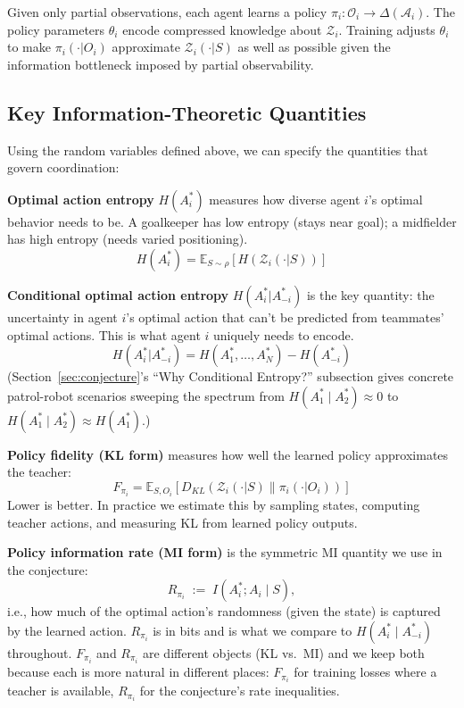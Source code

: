 \documentclass[10pt, letterpaper]{article}
\begin{document}
Given only partial observations, each agent learns a policy $\pi_i: \mathcal{O}_i \to \Delta(\mathcal{A}_i)$. The policy parameters $\theta_i$ encode compressed knowledge about $\mathcal{Z}_i$. Training adjusts $\theta_i$ to make $\pi_i(\cdot|O_i)$ approximate $\mathcal{Z}_i(\cdot|S)$ as well as possible given the information bottleneck imposed by partial observability.

\subsection{Key Information-Theoretic Quantities}

Using the random variables defined above, we can specify the quantities that govern coordination:

\textbf{Optimal action entropy} $H(A_i^*)$ measures how diverse agent $i$'s optimal behavior needs to be. A goalkeeper has low entropy (stays near goal); a midfielder has high entropy (needs varied positioning).
\[H(A_i^*) = \mathbb{E}_{S \sim \rho} \left[ H(\mathcal{Z}_i(\cdot|S)) \right]\]

\textbf{Conditional optimal action entropy} $H(A_i^*|A_{-i}^*)$ is the key quantity: the uncertainty in agent $i$'s optimal action that can't be predicted from teammates' optimal actions. This is what agent $i$ uniquely needs to encode.
\[H(A_i^*|A_{-i}^*) = H(A_1^*, \ldots, A_N^*) - H(A_{-i}^*)\]
(Section~\ref{sec:conjecture}'s ``Why Conditional Entropy?'' subsection gives concrete patrol-robot scenarios sweeping the spectrum from $H(A_1^* \mid A_2^*) \approx 0$ to $H(A_1^* \mid A_2^*) \approx H(A_1^*)$.)

\textbf{Policy fidelity (KL form)} measures how well the learned policy approximates the teacher:
\[F_{\pi_i} = \mathbb{E}_{S, O_i} \left[ D_{KL}(\mathcal{Z}_i(\cdot|S) \| \pi_i(\cdot|O_i)) \right]\]
Lower is better. In practice we estimate this by sampling states, computing teacher actions, and measuring KL from learned policy outputs.

\textbf{Policy information rate (MI form)} is the symmetric MI quantity we use in the conjecture:
\[R_{\pi_i} \;:=\; I(A_i^*; A_i \mid S),\]
i.e., how much of the optimal action's randomness (given the state) is captured by the learned action. $R_{\pi_i}$ is in bits and is what we compare to $H(A_i^* \mid A_{-i}^*)$ throughout. $F_{\pi_i}$ and $R_{\pi_i}$ are different objects (KL vs.\ MI) and we keep both because each is more natural in different places: $F_{\pi_i}$ for training losses where a teacher is available, $R_{\pi_i}$ for the conjecture's rate inequalities.
\end{document}
